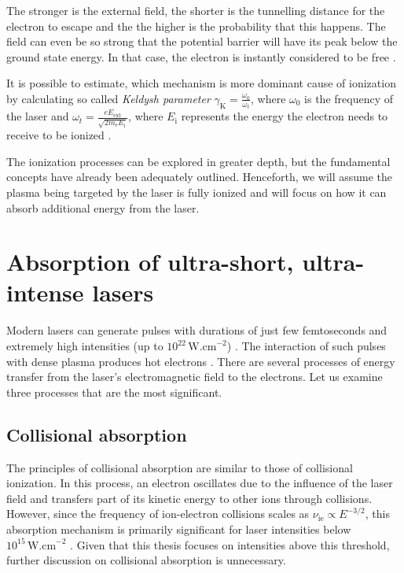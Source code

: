 The stronger is the external field, the shorter is the tunnelling distance for the electron to escape and the the higher is the probability that this happens. The field can even be so strong that the potential barrier will have its peak below the ground state energy. In that case, the electron is instantly considered to be free \cite{laser-plasma1}. 

It is possible to estimate, which mechanism is more dominant cause of ionization by calculating so called \textit{Keldysh parameter} $\gamma_\mathrm{K} = \frac{\omega_0}{\omega_t}$, where $\omega_0$ is the frequency of the laser and $\omega_t = \frac{eE_{\mathrm{ext}}}{\sqrt{2m_{\mathrm{e}}E_\mathrm{i}}}$, where $E_\mathrm{i}$ represents the energy the electron needs to receive to be ionized \cite{laser-plasma1}.

The ionization processes can be explored in greater depth, but the fundamental concepts have already been adequately outlined. Henceforth, we will assume the plasma being targeted by the laser is fully ionized and will focus on how it can absorb additional energy from the laser.

\section{Absorption of ultra-short, ultra-intense lasers}
Modern lasers can generate pulses with durations of just few femtoseconds and extremely high intensities (up to 
$10^{22}\,\mathrm{W.cm}^{-2}$) \cite{absorption2,ultra-laser}. The interaction of such pulses with dense plasma produces hot electrons \cite{laser-plasma5}. There are several processes of energy transfer from the laser's electromagnetic field to the electrons. Let us examine three processes that are the most significant.

\subsection*{Collisional absorption}
The principles of collisional absorption are similar to those of collisional ionization. In this process, an electron oscillates due to the influence of the laser field and transfers part of its kinetic energy to other ions through collisions. However, since the frequency of ion-electron collisions scales as $\nu_\mathrm{ie} \propto E^{-3/2}$, this absorption mechanism is primarily significant for laser intensities below $10^{15}\,\mathrm{W.cm}^{-2}$ \cite{absorption1}. Given that this thesis focuses on intensities above this threshold, further discussion on collisional absorption is unnecessary.

